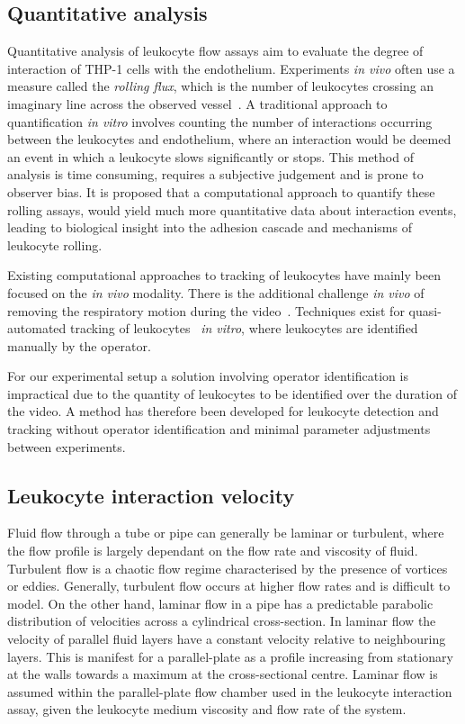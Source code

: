 \subsection{Quantitative analysis}
\label{leukocytes:introduction:quantitative}
Quantitative analysis of leukocyte flow assays aim to evaluate the degree of interaction of THP-1 cells with the endothelium. Experiments \emph{in vivo} often use a measure called the \emph{rolling flux}, which is the number of leukocytes crossing an imaginary line across the observed vessel~\cite{Sperandio2006}. A traditional approach to quantification \emph{in vitro} involves counting the number of interactions occurring between the leukocytes and endothelium, where an interaction would be deemed an event in which a leukocyte slows significantly or stops. This method of analysis is time consuming, requires a subjective judgement and is prone to observer bias. It is proposed that a computational approach to quantify these rolling assays, would yield much more quantitative data about interaction events, leading to biological insight into the adhesion cascade and mechanisms of leukocyte rolling.

Existing computational approaches to tracking of leukocytes have mainly been focused on the \emph{in vivo} modality. There is the additional challenge \emph{in vivo} of removing the respiratory motion during the video~\cite{Ray2002,Sperandio2006}. Techniques exist for quasi-automated tracking of leukocytes~\cite{Acton2002, Debeir2005} \emph{in vitro}, where leukocytes are identified manually by the operator.

For our experimental setup a solution involving operator identification is impractical due to the quantity of leukocytes to be identified over the duration of the video. A method has therefore been developed for leukocyte detection and tracking without operator identification and minimal parameter adjustments between experiments.

\subsection{Leukocyte interaction velocity}
\label{leukocytes:introduction:velocity}
Fluid flow through a tube or pipe can generally be laminar or turbulent, where the flow profile is largely dependant on the flow rate and viscosity of fluid. Turbulent flow is a chaotic flow regime characterised by the presence of vortices or eddies. Generally, turbulent flow occurs at higher flow rates and is difficult to model. On the other hand, laminar flow in a pipe has a predictable parabolic distribution of velocities across a cylindrical cross-section. In laminar flow the velocity of parallel fluid layers have a constant velocity relative to neighbouring layers. This is manifest for a parallel-plate as a profile increasing from stationary at the walls towards a maximum at the cross-sectional centre. Laminar flow is assumed within the parallel-plate flow chamber used in the leukocyte interaction assay, given the leukocyte medium viscosity and flow rate of the system.

